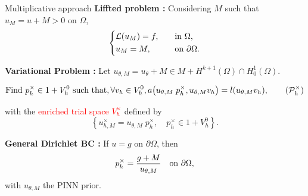 \begin{frame}{Multiplicative approach}
	\textbf{Liffted problem :} Considering $M$ such that $u_M=u+M>0$ on $\Omega$,
	\begin{equation*}
		\begin{dcases}
			\mathcal{L}(u_M)=f, &
			\text{\quad in } \Omega,          \\
			u_M = M,                  &
			\text{\quad on } \partial \Omega. \\
		\end{dcases}
	\end{equation*}

	\textbf{Variational Problem :} Let $u_{\theta,M}=u_\theta+M \in M + H^{k+1}(\Omega)\cap H^1_0(\Omega)$.
	
	\vspace{-5pt}
	\begin{equation}
		\label{eq:weaktimes}
		\text{Find } p_h^\times \in 1 + V_h^0 \text{ such that}, \forall v_h \in V_h^0, a \big(u_{\theta,M} \; p_h^\times,u_{\theta,M}  v_h \big) = l(u_{\theta,M} v_h),\tag{$\mathcal{P}_h^\times$}
	\end{equation}

	\vspace{5pt}
	\begin{minipage}[t]{0.6\linewidth}
		with the \textcolor{red}{enriched trial space $V_h^\times$} defined by
		\begin{equation*}
			\left\{
			u_{h,M}^\times = u_{\theta,M} \; p_h^\times,
			\quad p_h^\times \in 1+V_h^0
			\right\}.
		\end{equation*}
	
		\vspace{2pt}
		\textbf{General Dirichlet BC :} If $u=g$ on $\partial \Omega$, then
		\[
			p_h^\times = \frac{g+M}{u_{\theta,M}} \text{\quad on } \partial \Omega,
		\]
		with $u_{\theta,M}$ the PINN prior. 
	\end{minipage} 
\end{frame}

